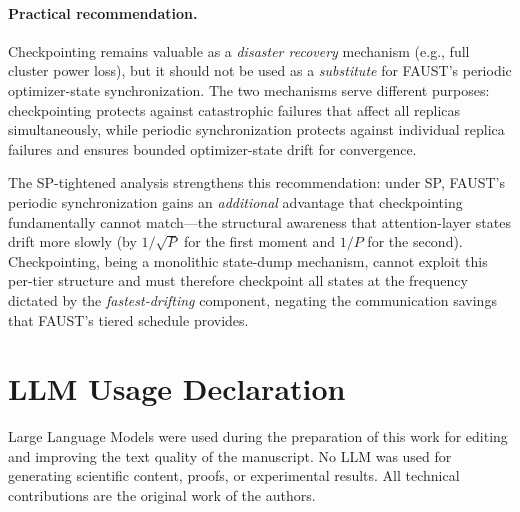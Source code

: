 \documentclass{article}
\begin{document}
\paragraph{Practical recommendation.}
Checkpointing remains valuable as a \emph{disaster recovery} mechanism
(e.g., full cluster power loss), but it should not be used as a
\emph{substitute} for FAUST's periodic optimizer-state
synchronization. The two mechanisms serve different purposes:
checkpointing protects against catastrophic failures that affect all
replicas simultaneously, while periodic synchronization protects against
individual replica failures and ensures bounded optimizer-state drift
for convergence.

The SP-tightened analysis strengthens this recommendation: under SP,
FAUST's periodic synchronization gains an \emph{additional} advantage
that checkpointing fundamentally cannot match---the structural
awareness that attention-layer states drift more slowly (by $1/\sqrt{P}$
for the first moment and $1/P$ for the second). Checkpointing, being a
monolithic state-dump mechanism, cannot exploit this per-tier structure
and must therefore checkpoint all states at the frequency dictated by
the \emph{fastest-drifting} component, negating the communication savings
that FAUST's tiered schedule provides.



\section{LLM Usage Declaration}
\label{sec:llm_usage}

Large Language Models were used during the preparation of this work for editing and improving the
text quality of the manuscript. No LLM was used for generating scientific content, proofs, or
experimental results. All technical contributions are the original work of the authors.



\clearpage

\end{document}
